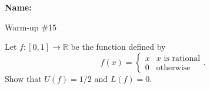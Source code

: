 \documentclass[12pt]{article}
\begin{document}
\noindent \textbf{Name:} 

\begin{center}
Warm-up \#15
\end{center}

\noindent Let $f : [0,1] \to \mathbb{R}$ be the function defined by 
\[
f(x) = \begin{cases}
x & \text{$x$ is rational} \\
0 & \text{otherwise}
\end{cases}.
\]
Show that $U(f) = 1/2$ and $L(f) = 0$. 
\end{document}
